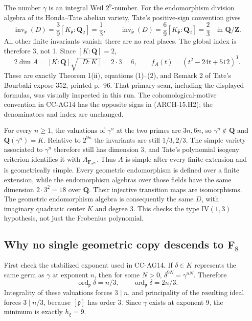 The number \(\gamma\) is an integral Weil \(2^9\)-number. For the
endomorphism division algebra of its Honda--Tate abelian variety,
Tate's positive-sign convention gives
\[
 \operatorname{inv}_{\mathfrak p}(D)=\frac39[ K_{\mathfrak p}:\mathbf Q_2]
     =\frac13,
 \qquad
 \operatorname{inv}_{\bar{\mathfrak p}}(D)=\frac69
     [K_{\bar{\mathfrak p}}:\mathbf Q_2]=\frac23
     \quad\text{in }\mathbf Q/\mathbf Z.
 \tag{ARCH-15.H2}
\]
All other finite invariants vanish; there are no real places. The
global index is therefore 3, not 1. Since \([K:\mathbf Q]=2\),
\[
 2\dim A=[K:\mathbf Q]\sqrt{[D:K]}=2\cdot3=6,
 \qquad f_A(t)=(t^2-24t+512)^3.
 \tag{ARCH-15.H3}
\]
These are exactly Theorem 1(ii), equations (1)--(2), and Remark 2 of
Tate's Bourbaki expose 352, printed p.~96. That primary scan, including
the displayed formulas, was visually inspected in this run. The
cohomological-motive convention in CC-AG14 has the opposite signs in
(ARCH-15.H2); the denominators and index are unchanged.

For every \(n\ge1\), the valuations of \(\gamma^n\) at the two primes
are \(3n,6n\), so \(\gamma^n\notin\mathbf Q\) and
\(\mathbf Q(\gamma^n)=K\). Relative to \(2^{9n}\) the invariants
are still \(1/3,2/3\). The simple variety associated to \(\gamma^n\)
therefore still has dimension 3, and Tate's polynomial isogeny
criterion identifies it with \(A_{\mathbf F_{2^{9n}}}\). Thus \(A\)
is simple after every finite extension and is geometrically simple.
Every geometric endomorphism is defined over a finite extension, while
the endomorphism algebras over those fields have the same dimension
\(2\cdot3^2=18\) over \(\mathbf Q\). Their injective transition maps
are isomorphisms. The geometric endomorphism algebra is consequently
the same \(D\), with imaginary quadratic center \(K\) and degree 3.
This checks the type \(\mathrm{IV}(1,3)\) hypothesis, not just the
Frobenius polynomial.

\subsection{Why no single geometric copy descends to \(\mathbf F_8\)}

First check the stabilized exponent used in CC-AG14. If
\(\delta\in K\) represents the same germ as \(\gamma\) at exponent
\(n\), then for some \(N>0\),
\(\delta^{9N}=\gamma^{nN}\). Therefore
\[
 \operatorname{ord}_{\mathfrak p}\delta=n/3,\qquad
 \operatorname{ord}_{\bar{\mathfrak p}}\delta=2n/3.
\]
Integrality of these valuations forces \(3\mid n\), and principality
of the resulting ideal forces \(3\mid n/3\), because
\([\mathfrak p]\) has order 3. Since \(\gamma\) exists at exponent
9, the minimum is exactly \(h_\xi=9\).

